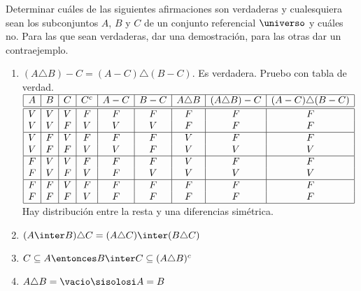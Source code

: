 \ejercicio Determinar cuáles de las siguientes afirmaciones son verdaderas y cualesquiera sean los subconjuntos $A$, $B$ y $C$ de un conjunto referencial $\universo$ y cuáles no.
Para las que sean verdaderas, dar una demostración, para las otras dar un contraejemplo.

\begin{enumerate}[label=\roman*)]
	\item $(A \triangle B) - C = (A-C) \triangle (B - C)$. Es verdadera. Pruebo con tabla de verdad.\\
	      $
		      \begin{array}{|c|c|c|c|c|c|c|c|c|}
			      \hline
			      A & B & C & C^c & A - C & B - C & A \triangle B & (A \triangle B) - C & (A - C) \triangle (B - C) \\
			      \hline  \hline
			      V & V & V & F   & F     & F     & F             & F                   & F                         \\
			      V & V & F & V   & V     & V     & F             & F                   & F                         \\
			      \hline
			      V & F & V & F   & F     & F     & V             & F                   & F                         \\
			      V & F & F & V   & V     & F     & V             & V                   & V                         \\
			      \hline
			      F & V & V & F   & F     & F     & V             & F                   & F                         \\
			      F & V & F & V   & F     & V     & V             & V                   & V                         \\
			      \hline
			      F & F & V & F   & F     & F     & F             & F                   & F                         \\
			      F & F & F & V   & F     & F     & F             & F                   & F                         \\
			      \hline
		      \end{array}
	      $\\
	      Hay distribución entre la resta y una diferencias simétrica.

	\item $(A \inter B) \triangle C = (A \triangle C) \inter (B \triangle C)$
	\item $C \subseteq A \entonces B \inter C \subseteq (A \triangle B)^c$
	\item $A \triangle B = \vacio \sisolosi A = B$
\end{enumerate}

